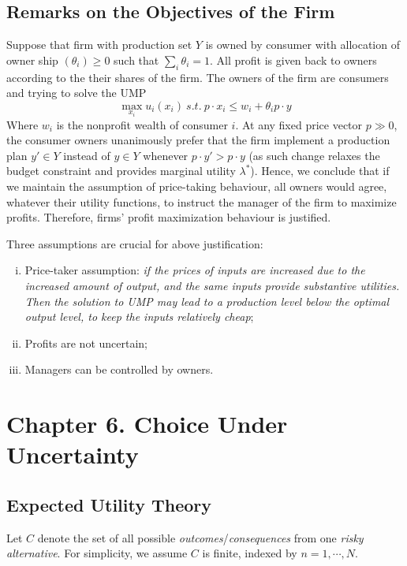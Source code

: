 \documentclass{article}
\begin{document}
	 	\subsection{Remarks on the Objectives of the Firm}
	 		\begin{remark}
	 			Suppose that firm with production set $Y$ is owned by consumer with allocation of owner ship $(\theta_i) \geq 0$ such that $\sum_i \theta_i = 1$. All profit is given back to owners according to the their shares of the firm. The owners of the firm are consumers and trying to solve the UMP
	 			\begin{equation}
	 				\max_{x_i} u_i(x_i)\ s.t.\ p \cdot x_i \leq w_i + \theta_i p \cdot y
	 			\end{equation}
	 			Where $w_i$ is the nonprofit wealth of consumer $i$. At any fixed price vector $p \gg 0$, the consumer owners unanimously prefer that the firm implement a production plan $y' \in Y$ instead of $y \in Y$ whenever $p\cdot y' > p\cdot y$ (as such change relaxes the budget constraint and provides marginal utility $\lambda^*$). Hence, we conclude that if we maintain the assumption of price-taking behaviour, all owners would agree, whatever their utility functions, to instruct the manager of the firm to maximize profits. Therefore, firms' profit maximization behaviour is justified.
	 		\end{remark}
	 		
	 		\begin{remark}
	 			Three assumptions are crucial for above justification:
	 			\begin{enumerate}[(i)]
	 				\item Price-taker assumption: \emph{if the prices of inputs are increased due to the increased amount of output, and the same inputs provide substantive utilities. Then the solution to UMP may lead to a production level below the optimal output level, to keep the inputs relatively cheap};   
	 				\item Profits are not uncertain;
	 				\item Managers can be controlled by owners.
	 			\end{enumerate}
	 		\end{remark}
	 \section{Chapter 6. Choice Under Uncertainty}
	 	\subsection{Expected Utility Theory}
	 		\begin{assumption}
	 			Let $C$ denote the set of all possible \emph{outcomes}/\emph{consequences} from one \emph{risky alternative}. For simplicity, we assume $C$ is finite, indexed by $n=1, \cdots, N$.
	 		\end{assumption}
	 		
\end{document}
